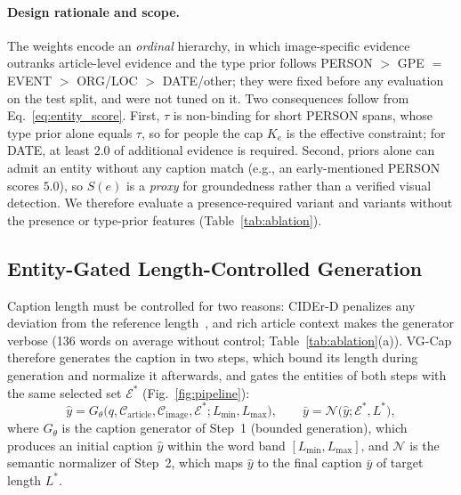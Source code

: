 \documentclass[runningheads]{llncs}
\DeclareRobustCommand{\aciids}[1]{{\color{olive}#1}}
\DeclareRobustCommand{\revise}[1]{{\color{olive}#1}}
\DeclareRobustCommand{\aciids}[1]{#1}
\DeclareRobustCommand{\revise}[1]{#1}
\begin{document}
\revise{\paragraph{Design rationale and scope.} The weights encode an \emph{ordinal} hierarchy, in which image-specific evidence outranks article-level evidence and \aciids{the type prior follows PERSON $>$ GPE \revise{$=$} EVENT $>$ ORG/LOC $>$ DATE/other}; they were fixed before any evaluation on the test split, and were not tuned on it. Two consequences follow from Eq.~\eqref{eq:entity_score}. First, $\tau$ is non-binding for short PERSON spans, whose type prior alone equals $\tau$, so for people the cap $K_e$ is the effective constraint; for DATE, at least $2.0$ of additional evidence is required. Second, priors alone can admit an entity without any caption match (e.g., an early-mentioned PERSON scores $5.0$), so $S(e)$ is a \emph{proxy} for groundedness rather than a verified visual detection. We therefore evaluate a presence-required variant and variants without the presence or type-prior features (Table~\ref{tab:ablation}).}


\subsection{\aciids{Entity-Gated Length-Controlled Generation}}
\label{sec:length_control}

\aciids{Caption length must be controlled for two reasons: CIDEr-D penalizes any deviation from the reference length~\cite{vedantam2015cider}, and rich article context makes the generator verbose (136 words on average without control; Table~\ref{tab:ablation}(a)). VG-Cap therefore generates the caption in two steps, which bound its length during generation and normalize it afterwards, and gates the entities of both steps with the same selected set $\mathcal{E}^{*}$ (Fig.~\ref{fig:pipeline}):}
\begin{equation}
\hat{y}=G_{\theta}\bigl(q,\mathcal{C}_{\mathrm{article}},\mathcal{C}_{\mathrm{image}},\mathcal{E}^{*};L_{\min},L_{\max}\bigr),
\qquad
\bar{y}=\mathcal{N}\bigl(\hat{y};\mathcal{E}^{*},L^{*}\bigr),
\label{eq:length_pipeline}
\end{equation}
\aciids{where $G_{\theta}$ is the caption generator of Step~1 (bounded generation), which produces an initial caption $\hat{y}$ within the word band $[L_{\min},L_{\max}]$, and $\mathcal{N}$ is the semantic normalizer of Step~2, which maps $\hat{y}$ to the final caption $\bar{y}$ of target length $L^{*}$.}
\end{document}
